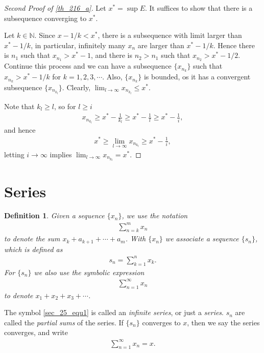 \documentclass[10pt]{book}
\newtheorem{definition}{Definition}[chapter]
\theoremstyle{definition}
\numberwithin{equation}{chapter}
\begin{document}
\begin{proof}[Second Proof of \ref{th_216_a}]
Let $x^* = \sup E$. It suffices to show that there is a subsequence converging to $x^*$. 

Let $k \in \mathbb{N}$. Since $x - 1/k < x^*$, there is a subsequence with limit larger than $x^* - 1/k$, in particular, infinitely many $x_n$ are larger than $x^* - 1/k$. Hence there is $n_1$ such that $x_{n_1} > x^* - 1$, and there is $n_2 > n_1$ such that $x_{n_2} > x^* - 1/2$. Continue this process and we can have a subsequence $\{x_{n_k}\}$ such that $x_{n_k} > x^* - 1/k$ for $k = 1,2,3,\cdots$. Also, $\{x_{n_k}\}$ is bounded, os it has a convergent subsequence $\{x_{n_{k_l}}\}$. Clearly, $\lim_{l\to\infty} x_{n_{k_l}} \leq x^*$. 

Note that $k_l \geq l$, so for $l \geq i$
\begin{align*}
    x_{n_{k_l}} \geq x^* - \frac{1}{k_l} \geq x^* - \frac{1}{l} \geq x^* - \frac{1}{i},
\end{align*}
and hence
\begin{align*}
    x^* \geq \lim_{l\to\infty} x_{n_{k_l}} \geq x^* - \frac{1}{i},
\end{align*}
letting $i \to \infty$ implies $\lim_{l\to\infty} x_{n_{k_l}} = x^*$.
\end{proof}



\medskip


\section{Series}

\begin{definition}
Given a sequence $\{x_n\}$, we use the notation
\begin{align*}
    \sum^m_{n=k} x_n
\end{align*}
to denote the sum $x_k + a_{k+1} + \cdots + a_m$. With $\{x_n\}$ we associate a sequence $\{s_n\}$, which is defined as
\begin{align*}
    s_n = \sum^n_{k=1} x_k.
\end{align*}
For $\{s_n\}$ we also use the symbolic expression 
\begin{align}\label{sec_25_equ1}
    \sum^\infty_{n=1} x_n
\end{align}
to denote $x_1 + x_2 + x_3 + \cdots$.
\end{definition}

The symbol \eqref{sec_25_equ1} is called an {\em infinite series}, or just a {\em series}. $s_n$ are called the {\em partial sums} of the series. If $\{s_n\}$ converges to $x$, then we say the series converges, and write
\begin{align*}
    \sum^\infty_{n=1} x_n = x.
\end{align*}
\end{document}
